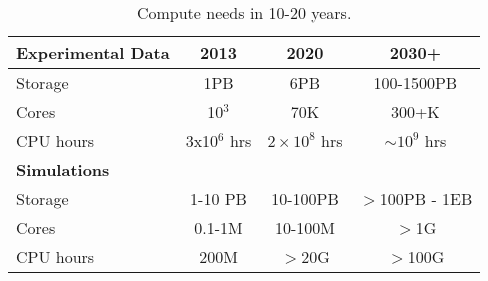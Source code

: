 \begin{center}
\begin{table}
\begin{tabular}{|l|c|c|c|} 
 \hline 
{\bf Experimental Data} & 2013 & 2020 & 2030+ \\
\hline
Storage & 1PB & 6PB & 100-1500PB \\
Cores & 10$^3$ & 70K & 300+K \\
CPU hours & 3x10$^6$ hrs & $2\times 10^8$ hrs & $\sim 10^9$ hrs \\
{\bf Simulations} &&& \\
Storage & 1-10 PB & 10-100PB & $>$100PB - 1EB\\
Cores & 0.1-1M & 10-100M &$>$1G\\
CPU hours & 200M & $>$20G & $>$100G
\label{tab:CompNeeds}
\end{tabular}
\caption{Compute needs in 10-20 years.}
\end{table}
\end{center}




%
